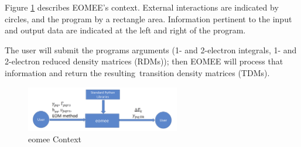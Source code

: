 \documentclass[12pt]{article}
\begin{document}

Figure \ref{Fig_SystemContext} describes EOMEE's context. 
External interactions are indicated by circles, and the program by a rectangle 
area. Information pertinent to the input and output data are indicated at the 
left and right of the program.

The user will submit the programs arguments (1- and 2-electron integrals, 1- 
and 2-electron reduced density matrices (RDMs)); then EOMEE will process
that information and return the resulting transition density matrices (TDMs). 

\begin{figure}[h!]
	\begin{center}
		\includegraphics[width=0.6\textwidth]{GlobalStatement}
		\caption{eomee Context}
		\label{Fig_SystemContext} 
	\end{center}
\end{figure}

\end{document}
